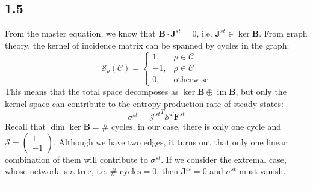 \documentclass[11pt]{article}
\begin{document}
	\subsection*{1.5}
	From the master equation, we know that $\mathbf{B}\cdot \mathbf{J}^{st}=0$, i.e. $\mathbf{J}^{st}\in\ker \mathbf{B}$. From graph theory, the kernel of incidence matrix can be spanned by cycles in the graph:
	\[
	\mathcal{S}_\rho (\mathcal{C})=\begin{cases}
		1,&\rho \in\mathcal{C}\\
		-1,&\rho \in\mathcal{C}\\
		0,&\text{otherwise}
	\end{cases}
	\]
	This means that the total space decomposes as $\ker{\mathbf{B}}\oplus\operatorname{im}\mathbf{B}$, but only the kernel space can contribute to the entropy production rate of steady states:
	\[
	\sigma^{st}={\mathcal{J}^{st}}^T\mathcal{S}^T\mathbf{F}^{st}
	\]
	Recall that $\dim\ker\mathbf{B}= \# \text{~cycles}$, in our case, there is only one cycle and $\mathcal{S}=\begin{pmatrix}1\\-1\end{pmatrix}$. Although we have two edges, it turns out that only one linear combination of them will contribute to $\sigma^{st}$. If we consider the extremal case, whose network is a tree, i.e. $\# \text{~cycles}=0$, then $\mathbf{J}^{st}=0$ and $\sigma^{st}$ must vanish.
	\bigskip\hrule\bigskip
\end{document}
